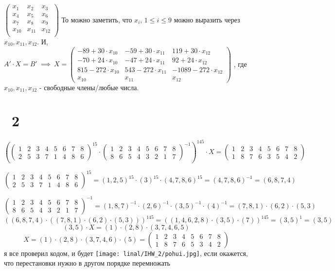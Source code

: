 \documentclass[17pt]{article}
\begin{document}
$
\begin{pmatrix}
x_1 & x_2 & x_3\\
x_4 & x_5 & x_6\\
x_7 & x_8 & x_9\\
x_{10} & x_{11} & x_{12}\\
\end{pmatrix}
$
То можно заметить, что $x_i$, $1 \leq i \leq 9$ можно выразить через $x_{10}, x_{11}, x_{12}$. И, $A' \cdot X = B'\ \implies\ X = 
\begin{pmatrix}
-89 + 30\cdot x_{10} & -59 + 30\cdot x_{11} & 119 + 30\cdot x_{12}\\
-70 + 24\cdot x_{10} & -47 + 24\cdot x_{11} & 92 + 24\cdot x_{12}\\
815 - 272\cdot x_{10} & 543 - 272\cdot x_{11} & -1089 - 272\cdot x_{12}\\
x_{10} & x_{11} & x_{12}
\end{pmatrix}
$
, где $x_{10}, x_{11}, x_{12}$ - свободные члены/любые числа.
\section*{\WashCotton\ 2}
$$
\left(
\begin{pmatrix}
1 & 2 & 3 & 4 & 5 & 6 & 7 & 8\\
2 & 5 & 3 & 7 & 1 & 4 & 8 & 6
\end{pmatrix}
^{15} \cdot
\begin{pmatrix}
1 & 2 & 3 & 4 & 5 & 6 & 7 & 8\\
8 & 6 & 5 & 4 & 3 & 2 & 1 & 7
\end{pmatrix}
^{-1}\right)^{145} \cdot X =
\begin{pmatrix}
1 & 2 & 3 & 4 & 5 & 6 & 7 & 8\\
1 & 8 & 7 & 6 & 3 & 5 & 4 & 2
\end{pmatrix} 
$$

$$
\begin{pmatrix}
1 & 2 & 3 & 4 & 5 & 6 & 7 & 8\\
2 & 5 & 3 & 7 & 1 & 4 & 8 & 6
\end{pmatrix}^{15}
= (1, 2, 5)^{15}\cdot(3)^{15}\cdot(4, 7, 8, 6)^{15}
= (4, 7, 8, 6)^{-1}
= (6, 8, 7, 4)
$$

$$
\begin{pmatrix}
1 & 2 & 3 & 4 & 5 & 6 & 7 & 8\\
8 & 6 & 5 & 4 & 3 & 2 & 1 & 7
\end{pmatrix}^{-1}
= 
(1, 8, 7)^{-1}\cdot (2, 6)^{-1}\cdot (3, 5)^{-1}\cdot (4)^{-1}
=
(7, 8, 1)\cdot (6, 2)\cdot (5, 3)
$$
$$
\left( (6, 8, 7, 4) \cdot 
\left((7, 8, 1)\cdot (6, 2)\cdot (5, 3)\right)
\right)^{145} = ((1, 4, 6, 2, 8)\cdot(3, 5)\cdot(7))^{145}
= (3, 5)^1 = (3, 5)
$$
$$
(3, 5) \cdot X = (1)\cdot(2, 8)\cdot(3, 7, 4, 6, 5)
$$
$$
X = (1)\cdot(2, 8)\cdot(3, 7, 4, 6)\cdot(5) =
\begin{pmatrix}
1 & 2 & 3 & 4 & 5 & 6 & 7 & 8\\
1 & 8 & 7 & 6 & 5 & 3 & 4 & 2
\end{pmatrix}
$$
я все проверил кодом, и будет \texttt{[image: linal/IHW\_2/pohui.jpg]}, если окажется, что перестановки нужно в другом порядке перемножать
\end{document}
